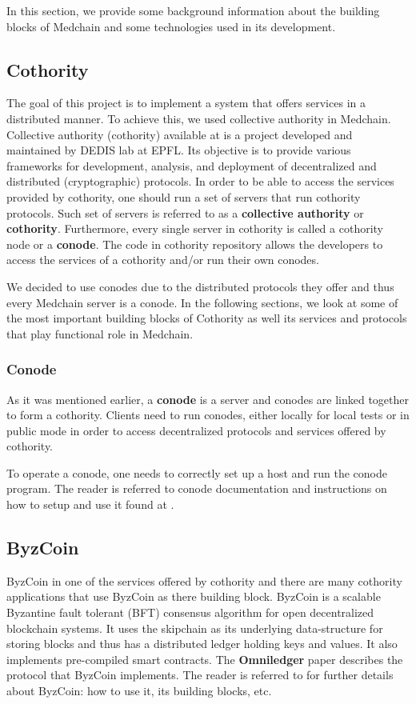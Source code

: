 In this section, we provide some background information about the building blocks of Medchain and some technologies used in its development. 

\subsection{Cothority}\label{cothority}
The goal of this project is to implement a system that offers services in a distributed manner. To achieve this, we used collective authority in Medchain. Collective authority (cothority) available at \cite{cothority:2019} is a project developed and maintained by DEDIS lab at EPFL. Its objective is to provide various frameworks for development, analysis, and deployment of decentralized and distributed (cryptographic) protocols. In order to be able to access the services provided by cothority, one should run a set of servers that run cothority protocols. Such set of servers is referred to as a \textbf{collective authority} or \textbf{cothority}. Furthermore, every single server in cothority is called a cothority node or a \textbf{conode}. The code in cothority repository allows the developers to access the services of a cothority and/or run their own conodes. 

We decided to use conodes due to the distributed protocols they offer and thus every Medchain server is a conode. In the following sections, we look at some of the most important building blocks of Cothority as well its services and protocols that play functional role in Medchain. 


 \subsubsection{Conode}\label{background:conode}
As it was mentioned earlier, a \textbf{conode} is a server and conodes are linked together to form a cothority. Clients need to run conodes, either locally for local tests or in public mode in order to access decentralized protocols and services offered by cothority.

To operate a conode, one needs to correctly set up a host and run the conode program. The reader is referred to conode documentation and instructions on how to setup and use it found at \cite{conode:2019}.

\subsection{ByzCoin}\label{background:byzcoin}
ByzCoin in one of the services offered by cothority and there are many cothority applications that use ByzCoin as there building block. ByzCoin is a scalable Byzantine fault tolerant (BFT) consensus algorithm for open decentralized blockchain systems. It uses the skipchain \cite{skipchain:2019} as its underlying data-structure for storing blocks and thus has a distributed ledger holding keys and values. It also implements pre-compiled smart contracts. The \textbf{Omniledger} paper \cite{kokoris2018omniledger} describes the protocol that ByzCoin implements. The reader is referred to \cite{byzcoin:2019} for further details about ByzCoin: how to use it, its building blocks, etc. 

